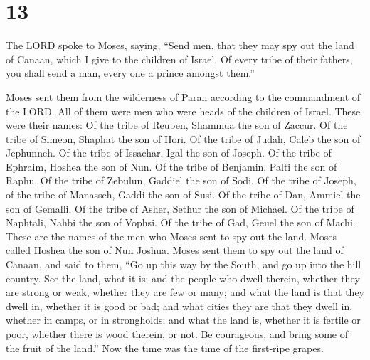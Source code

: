 \hypertarget{section-12}{%
\section{13}\label{section-12}}

 The LORD spoke to Moses, saying,  ``Send men,
that they may spy out the land of Canaan, which I give to the children
of Israel. Of every tribe of their fathers, you shall send a man, every
one a prince amongst them.''

 Moses sent them from the wilderness of Paran according to
the commandment of the LORD. All of them were men who were heads of the
children of Israel.  These were their names: Of the tribe of
Reuben, Shammua the son of Zaccur.  Of the tribe of Simeon,
Shaphat the son of Hori.  Of the tribe of Judah, Caleb the
son of Jephunneh.  Of the tribe of Issachar, Igal the son of
Joseph.  Of the tribe of Ephraim, Hoshea the son of Nun.
 Of the tribe of Benjamin, Palti the son of Raphu.
 Of the tribe of Zebulun, Gaddiel the son of Sodi.
 Of the tribe of Joseph, of the tribe of Manasseh, Gaddi
the son of Susi.  Of the tribe of Dan, Ammiel the son of
Gemalli.  Of the tribe of Asher, Sethur the son of Michael.
 Of the tribe of Naphtali, Nahbi the son of Vophsi.
 Of the tribe of Gad, Geuel the son of Machi. 
These are the names of the men who Moses sent to spy out the land. Moses
called Hoshea the son of Nun Joshua.  Moses sent them to
spy out the land of Canaan, and said to them, ``Go up this way by the
South, and go up into the hill country.  See the land, what
it is; and the people who dwell therein, whether they are strong or
weak, whether they are few or many;  and what the land is
that they dwell in, whether it is good or bad; and what cities they are
that they dwell in, whether in camps, or in strongholds; 
and what the land is, whether it is fertile or poor, whether there is
wood therein, or not. Be courageous, and bring some of the fruit of the
land.'' Now the time was the time of the first-ripe grapes.

